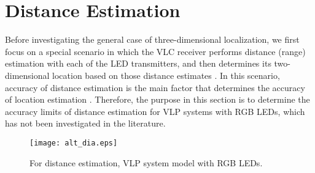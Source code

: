 \documentclass[10pt,twocolumn]{IEEEtran}
\newcommand{\mtC}{{\mathcal{C}}}
\begin{document}


\section{Distance Estimation}\label{sec:DistEst}

Before investigating the general case of three-dimensional localization, we first focus on a special scenario in which the VLC receiver performs distance (range) estimation with each of the LED transmitters, and then determines its two-dimensional location based on those distance estimates \cite{MFK_CRLB}. In this scenario, accuracy of distance estimation is the main factor that determines the accuracy of location estimation \cite[Sec.~VI]{MFK_CRLB}. Therefore, the purpose in this section is to determine the accuracy limits of distance estimation for VLP systems with RGB LEDs, which has not been investigated in the literature.


\begin{figure*}%
\centering
\texttt{[image: alt\_dia.eps]}
\caption{For distance estimation, VLP system model with RGB LEDs.}
\label{fig:system}
\end{figure*}
\end{document}
